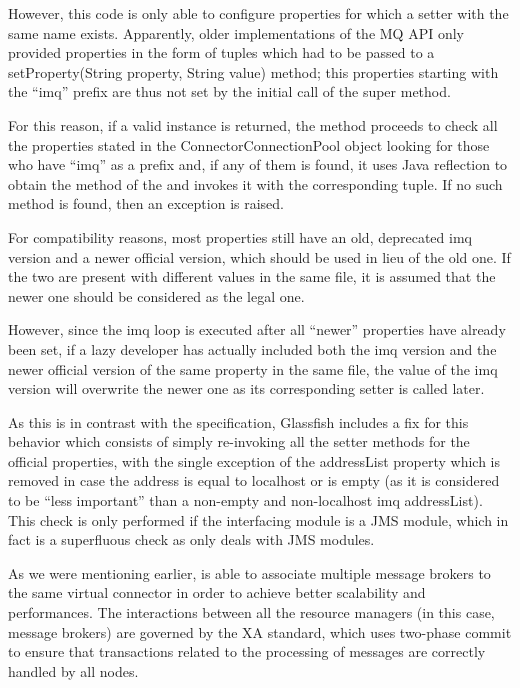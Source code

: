 However, this code is only able to configure properties for which a setter with the same name exists. Apparently, older implementations of the MQ API only provided properties in the form of  tuples which had to be passed to a setProperty(String property, String value) method; this properties starting with the “imq” prefix are thus not set by the initial call of the super  method.

For this reason, if a valid  instance is returned, the method proceeds to check all the properties stated in the ConnectorConnectionPool object looking for those who have “imq” as a prefix and, if any of them is found, it uses Java reflection to obtain the  method of the  and invokes it with the corresponding  tuple. If no such method is found, then an exception is raised.

For compatibility reasons, most properties still have an old, deprecated imq version and a newer official version, which should be used in lieu of the old one. If the two are present with different values in the same file, it is assumed that the newer one should be considered as the legal one.

However, since the imq loop is executed after all “newer” properties have already been set, if a lazy developer has actually included both the imq version and the newer official version of the same property in the same file, the value of the imq version will overwrite the newer one as its corresponding setter is called later.

As this is in contrast with the specification, Glassfish includes a fix for this behavior which consists of simply re-invoking all the setter methods for the official properties, with the single exception of the addressList property which is removed in case the address is equal to localhost or is empty (as it is considered to be “less important” than a non-empty and non-localhost imq addressList). This check is only performed if the interfacing module is a JMS module, which in fact is a superfluous check as  only deals with JMS modules. 

As we were mentioning earlier,  is able to associate multiple message brokers to the same virtual connector in order to achieve better scalability and performances. The interactions between all the resource managers (in this case, message brokers) are governed by the XA standard, which uses two-phase commit to ensure that transactions related to the processing of messages are correctly handled by all nodes.

